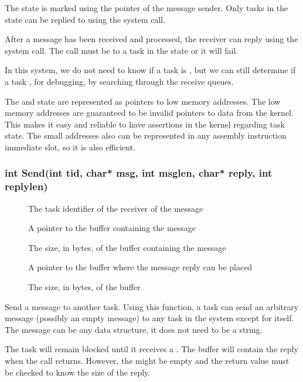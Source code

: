 \documentclass[pdftex,10pt,a4paper]{article}
\begin{document}
The  state is marked using the  pointer
of the message sender. Only tasks in the  state can
be replied to using the  system call.

After a message has been received and processed, the receiver can
reply using the  system call. The  call must be
to a task in the  state or it will fail.

In this system, we do not need to know if a task is
, but we can still determine if a task
, for debugging, by searching through the receive
queues.

The  and  state are represented
as pointers to low memory addresses. The low memory addresses are
guaranteed to be invalid pointers to data from the kernel. This makes
it easy and reliable to have assertions in the kernel regarding task
state. The small addresses also can be represented in any assembly
instruction immediate slot, so it is also efficient.


\subsubsection*{int Send(int tid, char* msg, int msglen, char* reply, int replylen)}

\begin{description}
\item[] The task identifier of the receiver of the message
\item[] A pointer to the buffer containing the message
\item[] The size, in bytes, of the buffer containing the message
\item[] A pointer to the buffer where the message reply can
  be placed
\item[] The size, in bytes, of the  buffer
\end{description}

Send a message to another task. Using this function, a task can send an
arbitrary message (possibly an empty message) to any task in the
system except for itself. The message can be any data structure, it
does not need to be a string.

The task will remain blocked until it receives a . The
 buffer will contain the reply when the call
returns. However, the  might be empty and the return value
must be checked to know the size of the reply.
\end{document}
